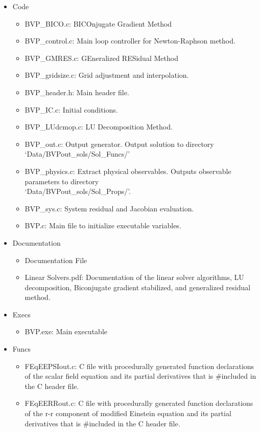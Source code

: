 \documentclass{article}
\begin{document}
\begin{itemize}
\item Code
\begin{itemize}
\item BVP\_BICO.c: BICOnjugate Gradient Method
\item BVP\_control.c: Main loop controller for Newton-Raphson method.
\item BVP\_GMRES.c: GEneralized RESidual Method
\item BVP\_gridsize.c: Grid adjustment and interpolation.
\item BVP\_header.h: Main header file.
\item BVP\_IC.c: Initial conditions.
\item BVP\_LUdcmop.c: LU Decomposition Method.
\item BVP\_out.c: Output generator. Output solution to directory `Data/BVPout\_sols/Sol\_Funcs/'
\item BVP\_physics.c: Extract physical observables. Outputs observable parameters to directory \\`Data/BVPout\_sols/Sol\_Props/'.
\item BVP\_sys.c: System residual and Jacobian evaluation.
\item BVP.c: Main file to initialize executable variables.
\end{itemize}
\item Documentation
\begin{itemize}
\item Documentation File
\item Linear Solvers.pdf: Documentation of the linear solver algorithms, LU decomposition, Biconjugate gradient stabilized, and generalized residual method. 
\end{itemize}
\item Execs
\begin{itemize}
\item BVP.exe: Main executable
\end{itemize}
\item Funcs
\begin{itemize}
\item FEqEEPSIout.c: C file with procedurally generated function declarations of the scalar field equation and its partial derivatives that is \#included in the C header file.
\item FEqEERRout.c:  C file with procedurally generated function declarations of the r-r component of modified Einstein equation and its partial derivatives that is \#included in the C header file.

\end{itemize}
\end{itemize}
\end{document}
